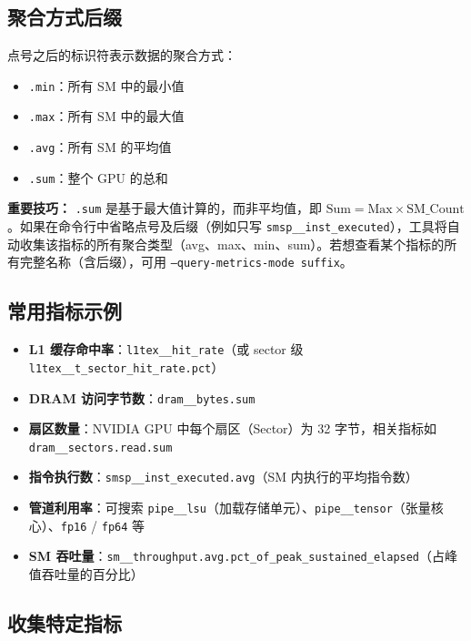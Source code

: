 \subsection{聚合方式后缀}

点号之后的标识符表示数据的聚合方式：

\begin{itemize}
    \item \texttt{.min}：所有 SM 中的最小值
    \item \texttt{.max}：所有 SM 中的最大值
    \item \texttt{.avg}：所有 SM 的平均值
    \item \texttt{.sum}：整个 GPU 的总和
\end{itemize}

\noindent \textbf{重要技巧：} \texttt{.sum} 是基于最大值计算的，而非平均值，即 $\text{Sum} = \text{Max} \times \text{SM\_Count}$。如果在命令行中省略点号及后缀（例如只写 \texttt{smsp\_\_inst\_executed}），工具将自动收集该指标的所有聚合类型（avg、max、min、sum）。若想查看某个指标的所有完整名称（含后缀），可用 \texttt{--query-metrics-mode suffix}。

\subsection{常用指标示例}

\begin{itemize}
    \item \textbf{L1 缓存命中率}：\texttt{l1tex\_\_hit\_rate}（或 sector 级 \texttt{l1tex\_\_t\_sector\_hit\_rate.pct}）
    \item \textbf{DRAM 访问字节数}：\texttt{dram\_\_bytes.sum}
    \item \textbf{扇区数量}：NVIDIA GPU 中每个扇区（Sector）为 32 字节，相关指标如 \texttt{dram\_\_sectors.read.sum}
    \item \textbf{指令执行数}：\texttt{smsp\_\_inst\_executed.avg}（SM 内执行的平均指令数）
    \item \textbf{管道利用率}：可搜索 \texttt{pipe\_\_lsu}（加载存储单元）、\texttt{pipe\_\_tensor}（张量核心）、\texttt{fp16} / \texttt{fp64} 等
    \item \textbf{SM 吞吐量}：\texttt{sm\_\_throughput.avg.pct\_of\_peak\_sustained\_elapsed}（占峰值吞吐量的百分比）
\end{itemize}

\subsection{收集特定指标}

